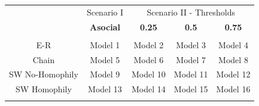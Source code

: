 \documentclass[man, 12pt, a4paper, nolmodern, noextraspace]{apa6}
\begin{document}
\begin{table}[!htbp]
\begin{minipage}{\textwidth}
  \begin{tabular}{ ccccc}
\toprule
      \multicolumn{1}{c}{} &
      \multicolumn{1}{c}{Scenario I} &
      \multicolumn{3}{c}{Scenario II - Thresholds} \\
\cline{3-5}
 & \textbf{Asocial} & \textbf{0.25} & \textbf{0.5} & \textbf{0.75} \\
\hline \\[-1.8ex] 
              E-R & Model 1 & Model 2 & Model 3 & Model 4 \\ 
            Chain & Model 5 & Model 6 & Model 7 & Model 8 \\ 
  SW No-Homophily & Model 9 & Model 10 & Model 11 & Model 12 \\ 
  	 SW Homophily & Model 13 & Model 14 & Model 15 & Model 16 \\ 
\hline \\[-1.8ex]  
	\end{tabular}
 	\end{minipage}
\end{table} 
\end{document}
